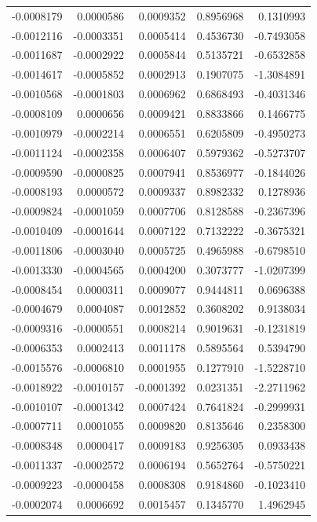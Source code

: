 \documentclass[]{tufte-handout}
\begin{document}
\begin{longtable}[]{@{}rrrrr@{}}
-0.0008179 & 0.0000586 & 0.0009352 & 0.8956968 & 0.1310993 \\
-0.0012116 & -0.0003351 & 0.0005414 & 0.4536730 & -0.7493058 \\
-0.0011687 & -0.0002922 & 0.0005844 & 0.5135721 & -0.6532858 \\
-0.0014617 & -0.0005852 & 0.0002913 & 0.1907075 & -1.3084891 \\
-0.0010568 & -0.0001803 & 0.0006962 & 0.6868493 & -0.4031346 \\
-0.0008109 & 0.0000656 & 0.0009421 & 0.8833866 & 0.1466775 \\
-0.0010979 & -0.0002214 & 0.0006551 & 0.6205809 & -0.4950273 \\
-0.0011124 & -0.0002358 & 0.0006407 & 0.5979362 & -0.5273707 \\
-0.0009590 & -0.0000825 & 0.0007941 & 0.8536977 & -0.1844026 \\
-0.0008193 & 0.0000572 & 0.0009337 & 0.8982332 & 0.1278936 \\
-0.0009824 & -0.0001059 & 0.0007706 & 0.8128588 & -0.2367396 \\
-0.0010409 & -0.0001644 & 0.0007122 & 0.7132222 & -0.3675321 \\
-0.0011806 & -0.0003040 & 0.0005725 & 0.4965988 & -0.6798510 \\
-0.0013330 & -0.0004565 & 0.0004200 & 0.3073777 & -1.0207399 \\
-0.0008454 & 0.0000311 & 0.0009077 & 0.9444811 & 0.0696388 \\
-0.0004679 & 0.0004087 & 0.0012852 & 0.3608202 & 0.9138034 \\
-0.0009316 & -0.0000551 & 0.0008214 & 0.9019631 & -0.1231819 \\
-0.0006353 & 0.0002413 & 0.0011178 & 0.5895564 & 0.5394790 \\
-0.0015576 & -0.0006810 & 0.0001955 & 0.1277910 & -1.5228710 \\
-0.0018922 & -0.0010157 & -0.0001392 & 0.0231351 & -2.2711962 \\
-0.0010107 & -0.0001342 & 0.0007424 & 0.7641824 & -0.2999931 \\
-0.0007711 & 0.0001055 & 0.0009820 & 0.8135646 & 0.2358300 \\
-0.0008348 & 0.0000417 & 0.0009183 & 0.9256305 & 0.0933438 \\
-0.0011337 & -0.0002572 & 0.0006194 & 0.5652764 & -0.5750221 \\
-0.0009223 & -0.0000458 & 0.0008308 & 0.9184860 & -0.1023410 \\
-0.0002074 & 0.0006692 & 0.0015457 & 0.1345770 & 1.4962945 \\

\end{longtable}
\end{document}
